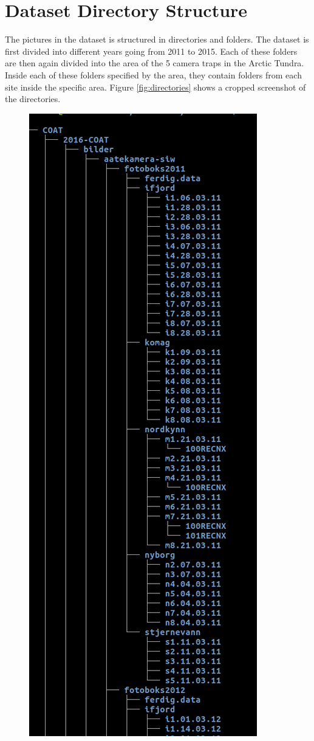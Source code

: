 \documentclass[USenglish]{uit-thesis}
\begin{document}
\section{Dataset Directory Structure}
The pictures in the dataset is structured in directories and folders. The dataset is first divided into different years going from 2011 to 2015. Each of these folders are then again divided into the area of the 5 camera traps in the Arctic Tundra. Inside each of these folders specified by the area, they contain folders from each site inside the specific area.
Figure \ref{fig:directories} shows a cropped screenshot of the directories.


\begin{figure}
\centering
\includegraphics[scale=0.5]{directory.png}

\end{figure}
\end{document}
